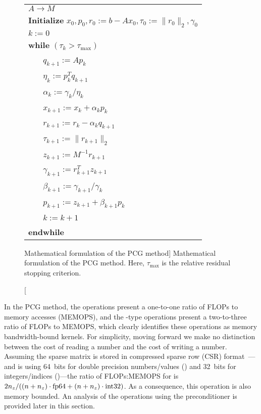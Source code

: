 \begin{figure}[t]
{\small
\begin{center}
\begin{tabular}{l}
\hline
  $A \rightarrow M$  
  \\ \textbf{Initialize} $x_0, p_0, r_0 := b-Ax_0, \tau_0 := \parallel
  r_{0}\parallel_2, 
\gamma_0$
\\ $k := 0$                                                
\\ {\bf while} $(\tau_{k} > \tau_{\max})$   
\\ ~~~ $q_{k+1}:=Ap_{k}$                        
\\ ~~~ $\eta_k:=p_{k}^Tq_{k+1}$    
\\ ~~~ $\alpha_k:=\gamma_k/\eta_k$    
\\ ~~~ $x_{k+1}:=x_k+\alpha_k p_{k}$           
\\ ~~~ $r_{k+1}:=r_k-\alpha_k q_{k+1}$            
\\ ~~~ $\tau_{k+1}:=\parallel r_{k+1}\parallel_2 $  
\\ ~~~ $z_{k+1}:=M^{-1} r_{k+1}$            
\\ ~~~ $\gamma_{k+1}:= r_{k+1}^T z_{k+1}$    
\\ ~~~ $\beta_{k+1}:=\gamma_{k+1}/\gamma_{k}$  
\\ ~~~ $p_{k+1}:= z_{k+1} + \beta_{k+1} p_k$ 

\\ ~~~ $k:=k+1$   
\\ {\bf endwhile}  
\\\hline
\end{tabular}
\end{center}
}
\caption
[Mathematical formulation of the PCG method]
{Mathematical formulation of the PCG method. Here, $\tau_{\max}$ is
the relative residual stopping criterion.}
\label{2017-adaptive-block-jacobi:fig:pcg}
\end{figure}

In the PCG method, the \dotp operations present a
one-to-one ratio
of FLOPs to memory accesses (MEMOPS), and the \axpy-type operations present a 
two-to-three ratio of FLOPs to MEMOPS, which clearly identifies these 
operations as 
memory bandwidth-bound kernels. For simplicity, moving forward we make no 
distinction between 
the cost of reading a number and the cost of writing a number. Assuming the 
sparse 
matrix is stored in compressed sparse row (CSR) format~\cite{saad}---and is 
using 64~bits for double precision numbers/values (\fpd) and 32~bits for 
integers/indices (\inti)---the 
ratio of FLOPs:MEMOPS for \spmv is $2n_z/((n+n_z) \cdot \mbox{\rm fp64} + (n+n_z) \cdot
\mbox{\rm int32})$. As a consequence,
this operation is also memory bounded.
An analysis of the operations using the preconditioner is provided later
in this section.

